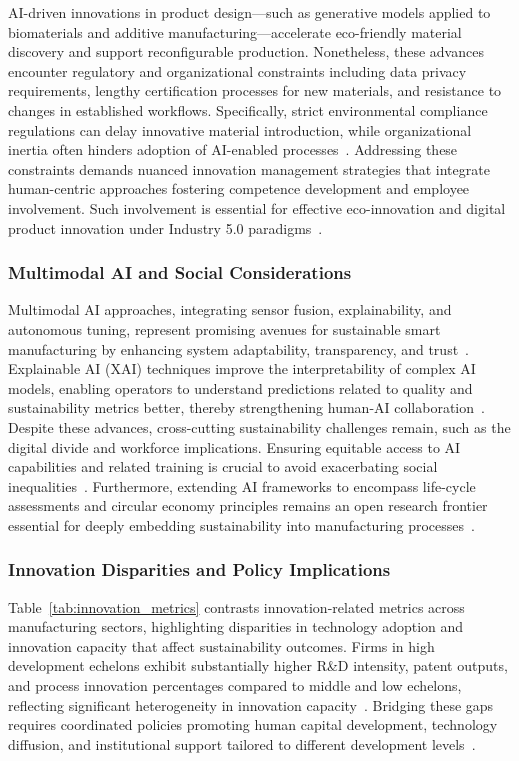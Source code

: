 \documentclass[sigconf]{acmart}
\begin{document}
AI-driven innovations in product design—such as generative models applied to biomaterials and additive manufacturing—accelerate eco-friendly material discovery and support reconfigurable production. Nonetheless, these advances encounter regulatory and organizational constraints including data privacy requirements, lengthy certification processes for new materials, and resistance to changes in established workflows. Specifically, strict environmental compliance regulations can delay innovative material introduction, while organizational inertia often hinders adoption of AI-enabled processes~\cite{ref14,ref21}. Addressing these constraints demands nuanced innovation management strategies that integrate human-centric approaches fostering competence development and employee involvement. Such involvement is essential for effective eco-innovation and digital product innovation under Industry 5.0 paradigms~\cite{ref14,ref21}.

\subsubsection{Multimodal AI and Social Considerations}

Multimodal AI approaches, integrating sensor fusion, explainability, and autonomous tuning, represent promising avenues for sustainable smart manufacturing by enhancing system adaptability, transparency, and trust~\cite{ref5,ref30}. Explainable AI (XAI) techniques improve the interpretability of complex AI models, enabling operators to understand predictions related to quality and sustainability metrics better, thereby strengthening human-AI collaboration~\cite{ref30}. Despite these advances, cross-cutting sustainability challenges remain, such as the digital divide and workforce implications. Ensuring equitable access to AI capabilities and related training is crucial to avoid exacerbating social inequalities~\cite{ref5}. Furthermore, extending AI frameworks to encompass life-cycle assessments and circular economy principles remains an open research frontier essential for deeply embedding sustainability into manufacturing processes~\cite{ref38}.

\subsubsection{Innovation Disparities and Policy Implications}

Table~\ref{tab:innovation_metrics} contrasts innovation-related metrics across manufacturing sectors, highlighting disparities in technology adoption and innovation capacity that affect sustainability outcomes. Firms in high development echelons exhibit substantially higher R\&D intensity, patent outputs, and process innovation percentages compared to middle and low echelons, reflecting significant heterogeneity in innovation capacity~\cite{ref21}. Bridging these gaps requires coordinated policies promoting human capital development, technology diffusion, and institutional support tailored to different development levels~\cite{ref21}.
\end{document}
